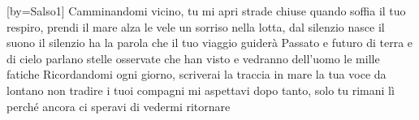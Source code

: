 [by={Salso1}]
\beginverse
Camminandomi vicino, tu mi apri strade chiuse
quando soffia il tuo respiro, prendi il mare alza le vele
un sorriso nella lotta, dal silenzio nasce il suono
il silenzio ha la parola che il tuo viaggio guiderà
\endverse
\beginchorus
Passato e futuro di terra e di cielo
parlano stelle osservate
che han visto e vedranno dell'uomo
le mille fatiche
\endchorus
\beginverse
Ricordandomi ogni giorno, scriverai la traccia in mare
la tua voce da lontano non tradire i tuoi compagni
mi aspettavi dopo tanto, solo tu rimani lì
perché ancora ci speravi di vedermi ritornare
\endverse
\endsong
